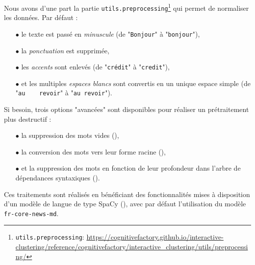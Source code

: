 	Nous avons d'une part la partie \texttt{utils.preprocessing}\footnote{
		\texttt{utils.preprocessing}: \url{https://cognitivefactory.github.io/interactive-clustering/reference/cognitivefactory/interactive_clustering/utils/preprocessing/}
	} qui permet de normaliser les données.
	Par défaut :
	\begin{itemize}
		\item[\(\bullet\)] le texte est passé en \textit{minuscule} (de "\texttt{Bonjour}" à "\texttt{bonjour}"),
		\item[\(\bullet\)] la \textit{ponctuation} est supprimée, %
		\item[\(\bullet\)] les \textit{accents} sont enlevés (de "\texttt{crédit}" à "\texttt{credit}"),
		\item[\(\bullet\)] et les multiples \textit{espaces blancs} sont convertis en un unique espace simple (de "\texttt{au~~~~revoir}" à "\texttt{au revoir}").
	\end{itemize}
	
	Si besoin, trois options "avancées" sont disponibles pour réaliser un prétraitement plus destructif :
	\begin{itemize}
		\item[\(\bullet\)] la suppression des mots vides (\cite{nothman-etal:2018:stop-word-lists}),
		\item[\(\bullet\)] la conversion des mots vers leur forme racine (\cite{manning-schutze:2000:foundations-statistical-natural}),
		\item[\(\bullet\)] et la suppression des mots en fonction de leur profondeur dans l'arbre de dépendances syntaxiques (\cite{nivre:2006:inductive-dependency-parsing}).
	\end{itemize}
	
	Ces traitements sont réalisés en bénéficiant des fonctionnalités mises à disposition d'un modèle de langue de type SpaCy (\cite{honnibal-montani:2017:spacy-natural-language}), avec par défaut l'utilisation du modèle \texttt{fr-core-news-md}.
	
